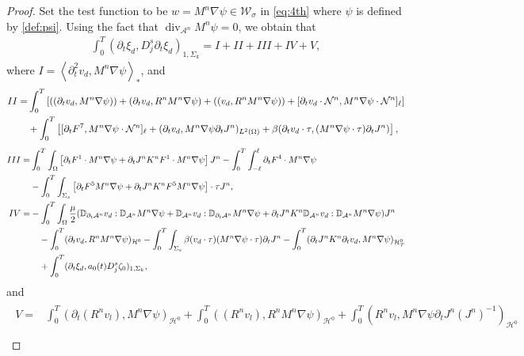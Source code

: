 \documentclass[letterpaper,reqno,10pt,twoside]{amsart}
\theoremstyle{definition}
\theoremstyle{remark}
\def\p{\partial}
\def\Om{\Omega}
\begin{document}
\begin{proof}
		Set the test function to be $w=M^{n}\nabla\psi\in \mathcal{W}_\sigma$ in \eqref{eq:4th} where $\psi$ is defined by \eqref{def:psi}. Using the fact that $\operatorname{div}_{\mathcal{A}^{n}}M^{n}\psi=0$, we obtain that
		\begin{equation}\label{eq:test_2}
			\begin{aligned}
				\int_{0}^{T}(\partial_{t}\xi_{d},D_{j}^{s}\partial_{t}\xi_{d})_{1,\Sigma_{k}}=I+II+III+IV+V,
			\end{aligned}
		\end{equation}
		where $I=\left<\partial_{t}^{2}v_{d},M^{n}\nabla\psi \right>_{*}$, and
		\[\begin{aligned}  
			II=&\int_{0}^{T} \left[((\p_tv_{d},M^{n}\nabla \psi))+(\partial_{t}v_{d},R^{n}M^{n}\nabla \psi)+((v_{d},R^{n}M^{n}\nabla\psi))+[\p_tv_{d}\cdot\mathcal{N}^{n},M^{n}\nabla\psi\cdot \mathcal{N}^{n}]_\ell\right]\notag\\&+\int_{0}^{T}\left[[\p_tF^7,M^{n}\nabla\psi\cdot\mathcal{N}^{n}]_\ell+(\partial_{t}v_{d},M^{n}\nabla\psi \partial_{t}J^{n})_{L^2(\Omega)}+\beta(\partial_{t}v_{d}\cdot \tau,(M^{n}\nabla\psi \cdot \tau)\partial_{t}J^{n})\right],
		\end{aligned}\]
		\[\begin{aligned}
			III=&\int_0^T\int_{\Om}\left[\p_tF^1\cdot M^{n}\nabla\psi +\p_tJ^{n}K^{n}F^1\cdot M^{n}\nabla\psi\right]J^{n}
			-\int_0^T\int_{-\ell}^{\ell} \p_tF^4\cdot M^{n}\nabla\psi \notag\\
			&-\int_0^T\int_{\Sigma_s}\left[\p_tF^5 M^{n}\nabla\psi+\p_tJ^{n}K^{n}F^5M^{n}\nabla\psi\right]\cdot\tau J^{n},\\
			IV=&-\int_0^T\int_\Om\frac{\mu}{2}(\mathbb{D}_{\p_t\mathcal{A}^{n}}v_{d}:\mathbb{D}_{\mathcal{A}^{n}}M^{n}\nabla\psi+\mathbb{D}_{\mathcal{A}^{n}}v_{d}:\mathbb{D}_{\p_t\mathcal{A}^{n}}M^{n}\nabla\psi+\p_tJ^{n}K^{n}\mathbb{D}_{\mathcal{A}^{n}}v_{d}:\mathbb{D}_{\mathcal{A}^{n}}M^{n}\nabla\psi)J^{n}\\
			&\quad-\int_{0}^{T}(\p_{t}v_{d},R^{n}M^{n}\nabla\psi)_{\mathcal{H}^{0}}-\int_0^T\int_{\Sigma_s}\beta(v_{d}\cdot\tau)(M^{n}\nabla\psi\cdot\tau)\p_tJ^{n}-\int_{0}^{T}(\p_tJ^{n}K^{n}\p_tv_{d}, M^{n}\nabla\psi)_{\mathcal{H}^0_T}\notag\\
			&\quad+\int_{0}^{T}(\p_{t}\xi_{d},a_{0}(t)D_{j}^{s}\zeta_{0})_{1,\Sigma_{k}},
		\end{aligned}\]
		and
		\[\begin{aligned}
			\begin{aligned}
				V=&\int_{0}^{T}(\p_{t}(R^{n}v_{l}),M^{n}\nabla \psi)_{\mathcal{H}^{0}}+\int_{0}^{T}((R^{n}v_{l}),R^{n}M^{n}\nabla \psi)_{\mathcal{H}^{0}}+\int_{0}^{T}(R^{n}v_{l},M^{n}\nabla\psi\p_{t}J^{n}(J^{n})^{-1})_{\mathcal{H}^{0}}\\

\end{aligned}
\end{aligned}\]
\end{proof}
\end{document}
